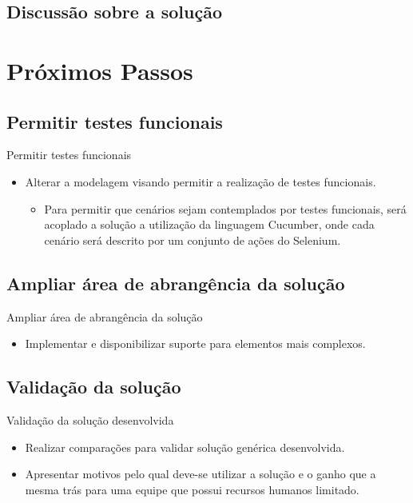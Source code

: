 \documentclass{beamer}
\begin{document}
\subsection{Discussão sobre a solução}
\section{Próximos Passos}
\subsection{Permitir testes funcionais}
\begin{frame}{Permitir testes funcionais}
	\begin{itemize}
		\item Alterar a modelagem visando permitir a realização de testes funcionais.
		\begin{itemize}
			\item Para permitir que cenários sejam contemplados por testes funcionais, será acoplado a solução a utilização da linguagem Cucumber, onde cada cenário será descrito por um conjunto de ações do Selenium.
		\end{itemize}
	\end{itemize}
\end{frame}

\subsection{Ampliar área de abrangência da solução}
\begin{frame}{Ampliar área de abrangência da solução}
	\begin{itemize}
		\item Implementar e disponibilizar suporte para elementos mais complexos.
	\end{itemize}
\end{frame}

\subsection{Validação da solução}
\begin{frame}{Validação da solução desenvolvida}
	\begin{itemize}
		\item Realizar comparações para validar solução genérica desenvolvida.
		\item Apresentar motivos pelo qual deve-se utilizar a solução e o ganho que a mesma trás para uma equipe que possui
	recursos humanos limitado.
	\end{itemize}
\end{frame}


\begin{frame}
\titlepage
\end{frame}
\end{document}
